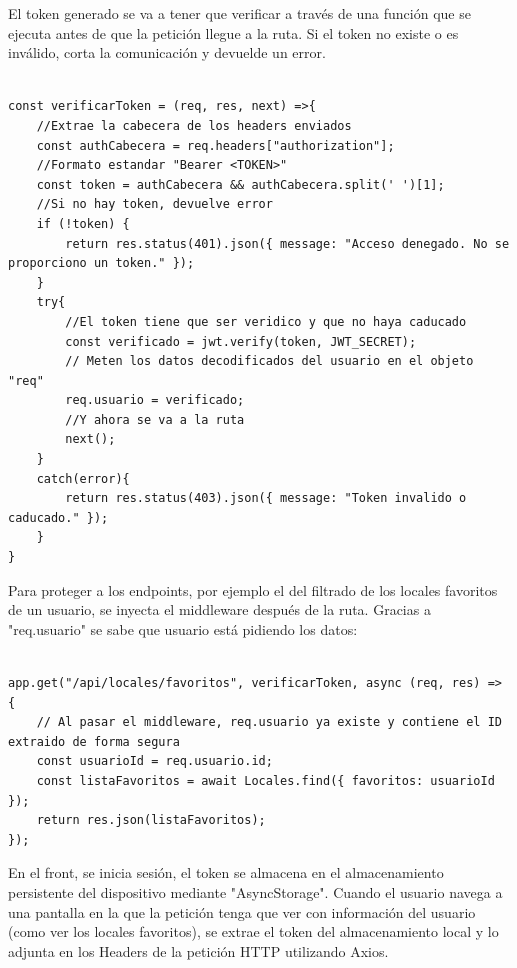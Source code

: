 \documentclass[a4paper,11pt]{article}
\begin{document}
El token generado se va a tener que verificar a través de una función que se ejecuta antes de que la petición llegue a la ruta. Si el token no existe o es inválido, corta la comunicación y devuelde un error. 

\vspace{0.8cm}

\begin{lstlisting}[style=javascript, caption={Middleware para proteger rutas con jwt}]

const verificarToken = (req, res, next) =>{
    //Extrae la cabecera de los headers enviados
    const authCabecera = req.headers["authorization"];
    //Formato estandar "Bearer <TOKEN>" 
    const token = authCabecera && authCabecera.split(' ')[1];
    //Si no hay token, devuelve error
    if (!token) {
        return res.status(401).json({ message: "Acceso denegado. No se proporciono un token." });
    }
    try{
        //El token tiene que ser veridico y que no haya caducado
        const verificado = jwt.verify(token, JWT_SECRET);
        // Meten los datos decodificados del usuario en el objeto "req"
        req.usuario = verificado;
        //Y ahora se va a la ruta 
        next();
    }
    catch(error){
        return res.status(403).json({ message: "Token invalido o caducado." });
    }
}
\end{lstlisting}

Para proteger a los endpoints, por ejemplo el del filtrado de los locales favoritos de un usuario, se inyecta el middleware después de la ruta. Gracias a "req.usuario" se sabe que usuario está pidiendo los datos: 

\vspace{0.5cm}

\begin{lstlisting}[style=javascript, caption={Ejemplo de ruta con middleware}]

app.get("/api/locales/favoritos", verificarToken, async (req, res) => {
    // Al pasar el middleware, req.usuario ya existe y contiene el ID extraido de forma segura
    const usuarioId = req.usuario.id;
    const listaFavoritos = await Locales.find({ favoritos: usuarioId });
    return res.json(listaFavoritos);
});

\end{lstlisting}

En el front, se inicia sesión, el token se almacena en el almacenamiento persistente del dispositivo mediante "AsyncStorage". Cuando el usuario navega a una pantalla en la que la petición tenga que ver con información del usuario (como ver los locales favoritos), se extrae el token del almacenamiento local y lo adjunta en los Headers de la petición HTTP utilizando Axios.
\end{document}
